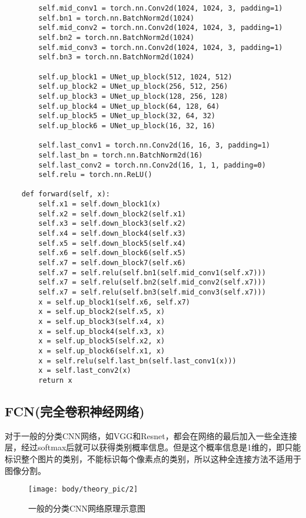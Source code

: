 \begin{lstlisting}
        self.mid_conv1 = torch.nn.Conv2d(1024, 1024, 3, padding=1)
        self.bn1 = torch.nn.BatchNorm2d(1024)
        self.mid_conv2 = torch.nn.Conv2d(1024, 1024, 3, padding=1)
        self.bn2 = torch.nn.BatchNorm2d(1024)
        self.mid_conv3 = torch.nn.Conv2d(1024, 1024, 3, padding=1)
        self.bn3 = torch.nn.BatchNorm2d(1024)

        self.up_block1 = UNet_up_block(512, 1024, 512)
        self.up_block2 = UNet_up_block(256, 512, 256)
        self.up_block3 = UNet_up_block(128, 256, 128)
        self.up_block4 = UNet_up_block(64, 128, 64)
        self.up_block5 = UNet_up_block(32, 64, 32)
        self.up_block6 = UNet_up_block(16, 32, 16)

        self.last_conv1 = torch.nn.Conv2d(16, 16, 3, padding=1)
        self.last_bn = torch.nn.BatchNorm2d(16)
        self.last_conv2 = torch.nn.Conv2d(16, 1, 1, padding=0)
        self.relu = torch.nn.ReLU()

    def forward(self, x):
        self.x1 = self.down_block1(x)
        self.x2 = self.down_block2(self.x1)
        self.x3 = self.down_block3(self.x2)
        self.x4 = self.down_block4(self.x3)
        self.x5 = self.down_block5(self.x4)
        self.x6 = self.down_block6(self.x5)
        self.x7 = self.down_block7(self.x6)
        self.x7 = self.relu(self.bn1(self.mid_conv1(self.x7)))
        self.x7 = self.relu(self.bn2(self.mid_conv2(self.x7)))
        self.x7 = self.relu(self.bn3(self.mid_conv3(self.x7)))
        x = self.up_block1(self.x6, self.x7)
        x = self.up_block2(self.x5, x)
        x = self.up_block3(self.x4, x)
        x = self.up_block4(self.x3, x)
        x = self.up_block5(self.x2, x)
        x = self.up_block6(self.x1, x)
        x = self.relu(self.last_bn(self.last_conv1(x)))
        x = self.last_conv2(x)
        return x
\end{lstlisting}

\subsection{FCN(完全卷积神经网络)}\label{fcnux5b8cux5168ux5377ux79efux795eux7ecfux7f51ux7edc}

对于一般的分类CNN网络，如VGG和Resnet，都会在网络的最后加入一些全连接层，经过softmax后就可以获得类别概率信息。但是这个概率信息是1维的，即只能标识整个图片的类别，不能标识每个像素点的类别，所以这种全连接方法不适用于图像分割。

\begin{figure}[htbp]
\centering
\texttt{[image: body/theory\_pic/2]}
\caption{一般的分类CNN网络原理示意图}
\label{fig::theory2}
\end{figure}

